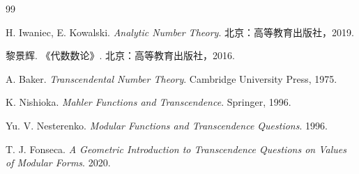 {\renewcommand{\bibname}{延伸阅读}
\begin{thebibliography}{99}

H. Iwaniec, E. Kowalski.
\textit{Analytic Number Theory}.
北京：高等教育出版社，2019.

黎景辉.
《代数数论》.
北京：高等教育出版社，2016.

A. Baker.
\textit{Transcendental Number Theory}.
Cambridge University Press, 1975.

K. Nishioka.
\textit{Mahler Functions and Transcendence}.
Springer, 1996.

Yu. V. Nesterenko.
\textit{Modular Functions and Transcendence Questions}.
1996.

T. J. Fonseca.
\textit{A Geometric Introduction to Transcendence Questions on Values of Modular Forms}.
2020.

\end{thebibliography}}
\printindex
